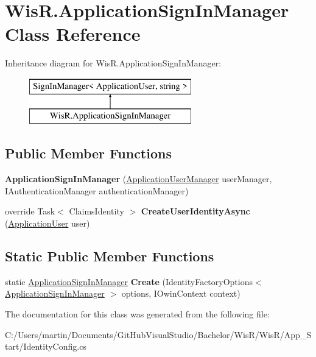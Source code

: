 \hypertarget{class_wis_r_1_1_application_sign_in_manager}{}\section{Wis\+R.\+Application\+Sign\+In\+Manager Class Reference}
\label{class_wis_r_1_1_application_sign_in_manager}
Inheritance diagram for Wis\+R.\+Application\+Sign\+In\+Manager\+:\begin{figure}[H]
\begin{center}
\leavevmode
\includegraphics[height=2.000000cm]{class_wis_r_1_1_application_sign_in_manager}
\end{center}
\end{figure}
\subsection*{Public Member Functions}
\begin{DoxyCompactItemize}
\item 
\hypertarget{class_wis_r_1_1_application_sign_in_manager_a9a1faf57b0de49c0d712ed1116f86c54}{}{\bfseries Application\+Sign\+In\+Manager} (\hyperlink{class_wis_r_1_1_application_user_manager}{Application\+User\+Manager} user\+Manager, I\+Authentication\+Manager authentication\+Manager)\label{class_wis_r_1_1_application_sign_in_manager_a9a1faf57b0de49c0d712ed1116f86c54}

\item 
\hypertarget{class_wis_r_1_1_application_sign_in_manager_a51565a59633461505c045b578a5f6e17}{}override Task$<$ Claims\+Identity $>$ {\bfseries Create\+User\+Identity\+Async} (\hyperlink{class_wis_r_1_1_models_1_1_application_user}{Application\+User} user)\label{class_wis_r_1_1_application_sign_in_manager_a51565a59633461505c045b578a5f6e17}

\end{DoxyCompactItemize}
\subsection*{Static Public Member Functions}
\begin{DoxyCompactItemize}
\item 
\hypertarget{class_wis_r_1_1_application_sign_in_manager_adc0438c0380722d85d623244a1ddae23}{}static \hyperlink{class_wis_r_1_1_application_sign_in_manager}{Application\+Sign\+In\+Manager} {\bfseries Create} (Identity\+Factory\+Options$<$ \hyperlink{class_wis_r_1_1_application_sign_in_manager}{Application\+Sign\+In\+Manager} $>$ options, I\+Owin\+Context context)\label{class_wis_r_1_1_application_sign_in_manager_adc0438c0380722d85d623244a1ddae23}

\end{DoxyCompactItemize}


The documentation for this class was generated from the following file\+:\begin{DoxyCompactItemize}
\item 
C\+:/\+Users/martin/\+Documents/\+Git\+Hub\+Visual\+Studio/\+Bachelor/\+Wis\+R/\+Wis\+R/\+App\+\_\+\+Start/Identity\+Config.\+cs\end{DoxyCompactItemize}
